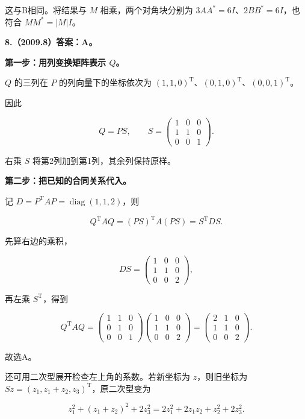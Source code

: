 \documentclass[UTF8,11pt,fontset=windows]{ctexart}
\begin{document}
这与B相同。将结果与 $M$ 相乘，两个对角块分别为 $3AA^*=6I$、$2BB^*=6I$，也符合 $MM^*=|M|I$。

\clearpage

\textbf{8.（2009.8）答案：A。}

\textbf{第一步：用列变换矩阵表示 $Q$。}

$Q$ 的三列在 $P$ 的列向量下的坐标依次为 $(1,1,0)^{\mathrm T}$、$(0,1,0)^{\mathrm T}$、$(0,0,1)^{\mathrm T}$。

因此

$$
Q=PS,\qquad
S=\begin{pmatrix}1&0&0\\1&1&0\\0&0&1\end{pmatrix}.
$$

右乘 $S$ 将第2列加到第1列，其余列保持原样。

\textbf{第二步：把已知的合同关系代入。}

记 $D=P^{\mathrm T}AP=\operatorname{diag}(1,1,2)$，则

$$
Q^{\mathrm T}AQ=(PS)^{\mathrm T}A(PS)
=S^{\mathrm T}DS.
$$

先算右边的乘积，

$$
DS=\begin{pmatrix}1&0&0\\1&1&0\\0&0&2\end{pmatrix},
$$

再左乘 $S^{\mathrm T}$，得到

$$
\boxed{Q^{\mathrm T}AQ
=\begin{pmatrix}1&1&0\\0&1&0\\0&0&1\end{pmatrix}
\begin{pmatrix}1&0&0\\1&1&0\\0&0&2\end{pmatrix}
=\begin{pmatrix}2&1&0\\1&1&0\\0&0&2\end{pmatrix}}.
$$

故选A。

还可用二次型展开检查左上角的系数。若新坐标为 $z$，则旧坐标为 $Sz=(z_1,z_1+z_2,z_3)^{\mathrm T}$，原二次型变为

$$
z_1^2+(z_1+z_2)^2+2z_3^2
=2z_1^2+2z_1z_2+z_2^2+2z_3^2.
$$
\end{document}
